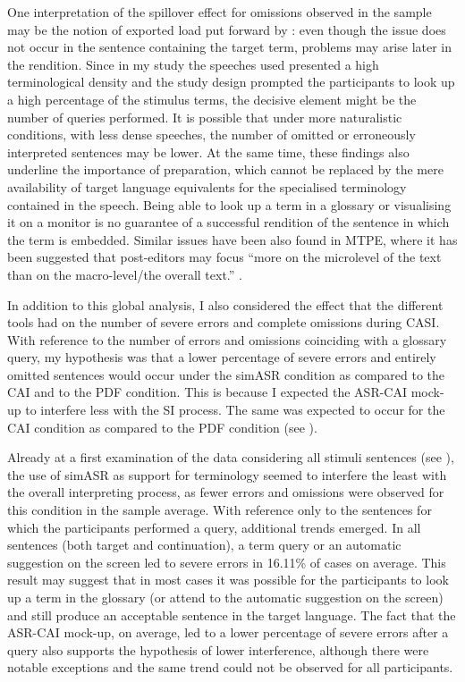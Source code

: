 One interpretation of the spillover effect for omissions observed in the sample may be the notion of exported load put forward by \citet{gile_local_2008}: even though the issue does not occur in the sentence containing the target term, problems may arise later in the rendition. Since in my study the speeches used presented a high terminological density and the study design prompted the participants to look up a high percentage of the stimulus terms, the decisive element might be the number of queries performed. It is possible that under more naturalistic conditions, with less dense speeches, the number of omitted or erroneously interpreted sentences may be lower. At the same time, these findings also underline the importance of preparation, which cannot be replaced by the mere availability of target language equivalents for the specialised terminology contained in the speech. Being able to look up a term in a glossary or visualising it on a monitor is no guarantee of a successful rendition of the sentence in which the term is embedded. Similar issues have been also found in MTPE, where it has been suggested that post-editors may focus ``more on the microlevel of the text than on the macro-level/the overall text.'' \citep[197]{culo2017}.

In addition to this global analysis, I also considered the effect that the different tools had on the number of severe errors and complete omissions during CASI. With reference to the number of errors and omissions coinciding with a glossary query, my hypothesis was that a lower percentage of severe errors and entirely omitted sentences would occur under the simASR condition as compared to the CAI and to the PDF condition. This is because I expected the ASR-CAI mock-up to interfere less with the SI process. The same was expected to occur for the CAI condition as compared to the PDF condition (see ).

Already at a first examination of the data considering all stimuli sentences (see ), the use of simASR as support for terminology seemed to interfere the least with the overall interpreting process, as fewer errors and omissions were observed for this condition in the sample average. With reference only to the sentences for which the participants performed a query, additional trends emerged. In all sentences (both target and continuation), a term query or an automatic suggestion on the screen led to severe errors in 16.11\% of cases on average. This result may suggest that in most cases it was possible for the participants to look up a term in the glossary (or attend to the automatic suggestion on the screen) and still produce an acceptable sentence in the target language. The fact that the ASR-CAI mock-up, on average, led to a lower percentage of severe errors after a query also supports the hypothesis of lower interference, although there were notable exceptions and the same trend could not be observed for all participants.

